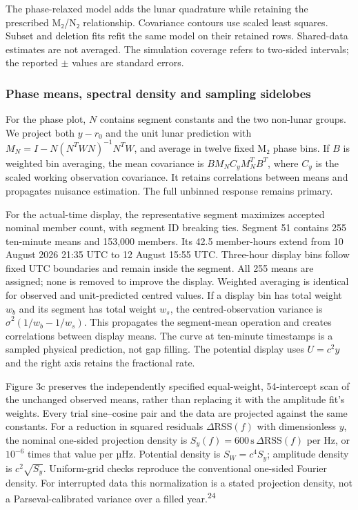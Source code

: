 \documentclass[
  12pt,
  a4paper,
]{article}
\begin{document}
The phase-relaxed model adds the lunar quadrature while retaining the
prescribed M₂/N₂ relationship. Covariance contours use scaled least
squares. Subset and deletion fits refit the same model on their retained
rows. Shared-data estimates are not averaged. The simulation coverage
refers to two-sided intervals; the reported \(\pm\) values are standard
errors.

\hypertarget{phase-means-spectral-density-and-sampling-sidelobes}{%
\subsubsection{Phase means, spectral density and sampling
sidelobes}\label{phase-means-spectral-density-and-sampling-sidelobes}}

For the phase plot, \(N\) contains segment constants and the two
non-lunar groups. We project both \(y-r_0\) and the unit lunar
prediction with \(M_N=I-N(N^TWN)^{-1}N^TW\), and average in twelve fixed
M₂ phase bins. If \(B\) is weighted bin averaging, the mean covariance
is \(BM_NC_yM_N^TB^T\), where \(C_y\) is the scaled working observation
covariance. It retains correlations between means and propagates
nuisance estimation. The full unbinned response remains primary.

For the actual-time display, the representative segment maximizes
accepted nominal member count, with segment ID breaking ties. Segment 51
contains 255 ten-minute means and 153,000 members. Its 42.5 member-hours
extend from 10 August 2026 21:35 UTC to 12 August 15:55 UTC. Three-hour
display bins follow fixed UTC boundaries and remain inside the segment.
All 255 means are assigned; none is removed to improve the display.
Weighted averaging is identical for observed and unit-predicted centred
values. If a display bin has total weight \(w_b\) and its segment has
total weight \(w_s\), the centred-observation variance is
\(\widehat\sigma^2(1/w_b-1/w_s)\). This propagates the segment-mean
operation and creates correlations between display means. The curve at
ten-minute timestamps is a sampled physical prediction, not gap filling.
The potential display uses \(U=c^2y\) and the right axis retains the
fractional rate.

Figure 3c preserves the independently specified equal-weight,
54-intercept scan of the unchanged observed means, rather than replacing
it with the amplitude fit's weights. Every trial sine--cosine pair and
the data are projected against the same constants. For a reduction in
squared residuals \(\Delta\mathrm{RSS}(f)\) with dimensionless \(y\),
the nominal one-sided projection density is
\(S_y(f)=600\,\mathrm{s}\,\Delta\mathrm{RSS}(f)\) per Hz, or \(10^{-6}\)
times that value per µHz. Potential density is \(S_W=c^4S_y\); amplitude
density is \(c^2\sqrt{S_y}\). Uniform-grid checks reproduce the
conventional one-sided Fourier density. For interrupted data this
normalization is a stated projection density, not a Parseval-calibrated
variance over a filled year.\textsuperscript{24}
\end{document}
